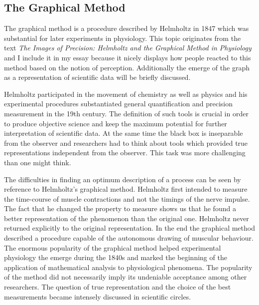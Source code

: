 \documentclass[12pt,a4paper]{article}
\begin{document}
\subsection*{The Graphical Method}

The graphical method is a procedure described by Helmholtz in 1847 which was substantial for later
experiments in physiology. This topic originates from the text {\it{The Images of Precision: Helmholtz
and the Graphical Method in Physiology}} \cite{holmes} and I include it in my essay because
it nicely displays how people reacted to this method based on the notion of perception.
Additionally the emerge of the graph as a representation of scientific data will be briefly discussed.

Helmholtz participated in the movement of chemistry as well as physics and his experimental
procedures substantiated general quantification and precision measurement in the 19th century.
The definition of such tools is crucial in order to produce objective science and keep the
maximum potential for further interpretation of scientific data.
At the same time the black box is inseparable from the observer and researchers had to
think about tools which provided true representations independent from the observer.
This task was more challenging than one might think.

The difficulties in finding an optimum description of a process can be seen by reference to
Helmholtz's graphical method. Helmholtz first intended to measure the time-course of
muscle contractions and not the timings of the nerve impulse.
The fact that he changed the property to measure shows us that he found a better
representation of the phenomenon than the original one. Helmholtz never returned explicitly to
the original representation. In the end the graphical method described a procedure
capable of the autonomous drawing of muscular behaviour. The enormous popularity of
the graphical method helped experimental physiology the emerge during the 1840s
and marked the beginning of the application of mathematical analysis to physiological
phenomena. The popularity of the method did not necessarily imply its undeniable acceptance among
other researchers. The question of true representation and the choice of the best measurements
became intensely discussed in scientific circles.
\end{document}
